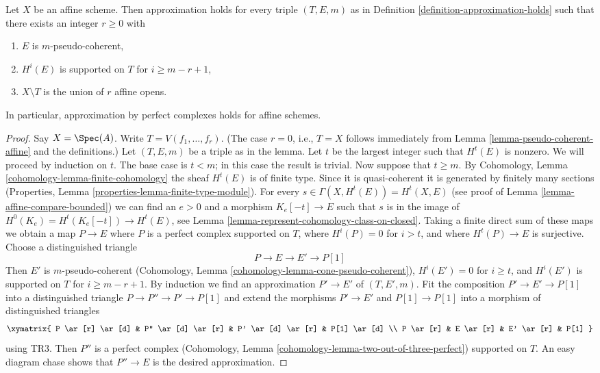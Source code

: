 \begin{lemma}
\label{lemma-approximation-affine}
Let $X$ be an affine scheme. Then approximation holds for every
triple $(T, E, m)$ as in Definition \ref{definition-approximation-holds}
such that there exists an integer $r \geq 0$ with
\begin{enumerate}
\item $E$ is $m$-pseudo-coherent,
\item $H^i(E)$ is supported on $T$ for $i \geq m - r + 1$,
\item $X \setminus T$ is the union of $r$ affine opens.
\end{enumerate}
In particular, approximation by perfect complexes holds for affine schemes.
\end{lemma}

\begin{proof}
Say $X = \Spec(A)$. Write $T = V(f_1, \ldots, f_r)$.
(The case $r = 0$, i.e., $T = X$ follows immediately from
Lemma \ref{lemma-pseudo-coherent-affine} and the definitions.)
Let $(T, E, m)$ be a triple as in the lemma.
Let $t$ be the largest integer such that $H^t(E)$ is nonzero.
We will proceed by induction on $t$. The base case is $t < m$; in
this case the result is trivial. Now suppose that $t \geq m$. By
Cohomology, Lemma \ref{cohomology-lemma-finite-cohomology}
the sheaf $H^t(E)$ is of finite type. Since it is quasi-coherent
it is generated by finitely many sections
(Properties, Lemma \ref{properties-lemma-finite-type-module}).
For every $s \in \Gamma(X, H^t(E)) = H^t(X, E)$
(see proof of Lemma \ref{lemma-affine-compare-bounded})
we can find an $e > 0$ and a morphism $K_e[-t] \to E$
such that $s$ is in the image of
$H^0(K_e) = H^t(K_e[-t]) \to H^t(E)$, see
Lemma \ref{lemma-represent-cohomology-class-on-closed}.
Taking a finite direct sum of these maps we obtain a map
$P \to E$ where $P$ is a perfect complex supported on $T$,
where $H^i(P) = 0$ for $i > t$, and where $H^t(P) \to E$ is
surjective. Choose a distinguished triangle
$$
P \to E \to E' \to P[1]
$$
Then $E'$ is $m$-pseudo-coherent
(Cohomology, Lemma \ref{cohomology-lemma-cone-pseudo-coherent}),
$H^i(E') = 0$ for $i \geq t$, and
$H^i(E')$ is supported on $T$ for $i \geq m - r + 1$.
By induction we find an approximation $P' \to E'$
of $(T, E', m)$. Fit the composition $P' \to E' \to P[1]$
into a distinguished triangle $P \to P'' \to P' \to P[1]$
and extend the morphisms $P' \to E'$ and $P[1] \to P[1]$ into
a morphism of distinguished triangles
$$
\xymatrix{
P \ar[r] \ar[d] & P'' \ar[d] \ar[r] & P' \ar[d] \ar[r] & P[1] \ar[d] \\
P \ar[r] &  E \ar[r] & E' \ar[r] & P[1]
}
$$
using TR3. Then $P''$ is a perfect complex
(Cohomology, Lemma \ref{cohomology-lemma-two-out-of-three-perfect})
supported on $T$.
An easy diagram chase shows that $P'' \to E$ is the desired
approximation.
\end{proof}
